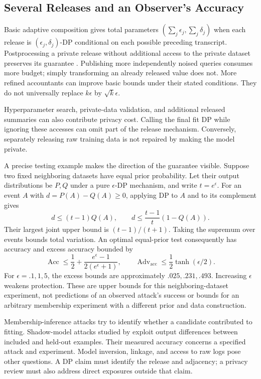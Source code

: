 \subsection{Several Releases and an Observer's Accuracy}

Basic adaptive composition gives total parameters $(\sum_j\epsilon_j,\sum_j\delta_j)$ when each release is $(\epsilon_j,\delta_j)$-DP conditional on each possible preceding transcript. Postprocessing a private release without additional access to the private dataset preserves its guarantee \citep{dwork2014privacy}. Publishing more independently noised queries consumes more budget; simply transforming an already released value does not. More refined accountants can improve basic bounds under their stated conditions. They do not universally replace $k\epsilon$ by $\sqrt{k}\epsilon$.

Hyperparameter search, private-data validation, and additional released summaries can also contribute privacy cost. Calling the final fit DP while ignoring these accesses can omit part of the release mechanism. Conversely, separately releasing raw training data is not repaired by making the model private.

A precise testing example makes the direction of the guarantee visible. Suppose two fixed neighboring datasets have equal prior probability. Let their output distributions be $P,Q$ under a pure $\epsilon$-DP mechanism, and write $t=e^\epsilon$. For an event $A$ with $d=P(A)-Q(A)\ge0$, applying DP to $A$ and to its complement gives
\[
d\le(t-1)Q(A),\qquad
d\le\frac{t-1}{t}(1-Q(A)).
\]
Their largest joint upper bound is $(t-1)/(t+1)$. Taking the supremum over events bounds total variation. An optimal equal-prior test consequently has accuracy and excess accuracy bounded by
\[
\operatorname{Acc}\le\frac12+
\frac{e^\epsilon-1}{2(e^\epsilon+1)},\qquad
\operatorname{Adv}_{\mathrm{acc}}\le\frac12\tanh(\epsilon/2).
\]
For $\epsilon=.1,1,5$, the excess bounds are approximately $.025,.231,.493$. Increasing $\epsilon$ weakens protection. These are upper bounds for this neighboring-dataset experiment, not predictions of an observed attack's success or bounds for an arbitrary membership experiment with a different prior and data construction.

Membership-inference attacks try to identify whether a candidate contributed to fitting. Shadow-model attacks studied by \citet{shokri2017} exploit output differences between included and held-out examples. Their measured accuracy concerns a specified attack and experiment. Model inversion, linkage, and access to raw logs pose other questions. A DP claim must identify the release and adjacency; a privacy review must also address direct exposures outside that claim.

